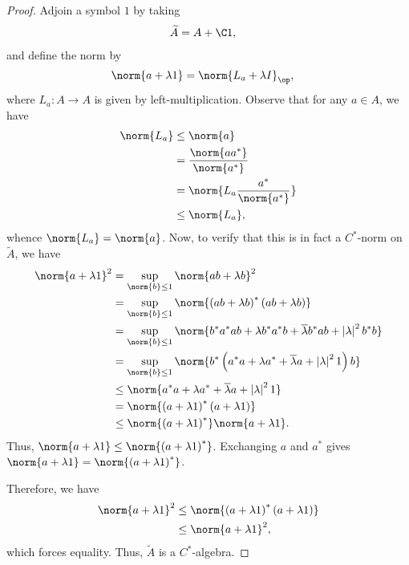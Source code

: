 \documentclass[10pt]{mypackage}
\begin{document}
\begin{proof}
  Adjoin a symbol $1$ by taking
  \begin{align*}
    \widetilde{A} &= A + \C 1,
  \end{align*}
  and define the norm by
  \begin{align*}
    \norm{a + \lambda 1} &= \norm{L_a + \lambda I}_{\op},
  \end{align*}
  where $L_a\colon A\rightarrow A$ is given by left-multiplication. Observe that for any $a\in A$, we have
  \begin{align*}
    \norm{L_a} &\leq \norm{a}\\
               &= \frac{\norm{aa^{\ast}}}{\norm{a^{\ast}}}\\
               &= \norm{L_a\frac{a^{\ast}}{\norm{a^{\ast}}}}\\
               &\leq \norm{L_a},
  \end{align*}
  whence $\norm{L_a} = \norm{a}$. Now, to verify that this is in fact a $C^{\ast}$-norm on $\widetilde{A}$, we have
  \begin{align*}
    \norm{a + \lambda 1}^2 &= \sup_{\norm{b}\leq 1} \norm{ab + \lambda b}^2\\
                           &= \sup_{\norm{b}\leq 1}\norm{\left( ab + \lambda b \right)^{\ast}\left( ab + \lambda b \right)}\\
                           &= \sup_{\norm{b}\leq 1}\norm{b^{\ast}a^{\ast}ab + \lambda b^{\ast}a^{\ast}b + \overline{\lambda}b^{\ast}ab + \left\vert \lambda \right\vert^2 b^{\ast}b}\\
                           &= \sup_{\norm{b}\leq 1} \norm{b^{\ast}\left( a^{\ast}a + \lambda a^{\ast} + \overline{\lambda}a + \left\vert \lambda \right\vert^21 \right)b}\\
                           &\leq \norm{a^{\ast}a + \lambda a^{\ast} + \overline{\lambda}a + \left\vert \lambda \right\vert^21}\\
                           &= \norm{\left( a + \lambda1 \right)^{\ast}\left( a+\lambda1 \right)}\\
                           &\leq \norm{\left( a+\lambda1 \right)^{\ast}}\norm{a+\lambda1}.
  \end{align*}
  Thus, $\norm{a + \lambda1}\leq \norm{\left( a+\lambda1 \right)^{\ast}}$. Exchanging $a$ and $a^{\ast}$ gives $\norm{a+\lambda 1} = \norm{\left( a+\lambda1 \right)^{\ast}}$.

  Therefore, we have
  \begin{align*}
    \norm{a+\lambda1}^2 &\leq \norm{\left( a+\lambda1 \right)^{\ast}\left( a+\lambda1 \right)}\\
                        &\leq \norm{a+\lambda1}^2,
  \end{align*}
  which forces equality. Thus, $\widetilde{A}$ is a $C^{\ast}$-algebra.
\end{proof}
\end{document}

